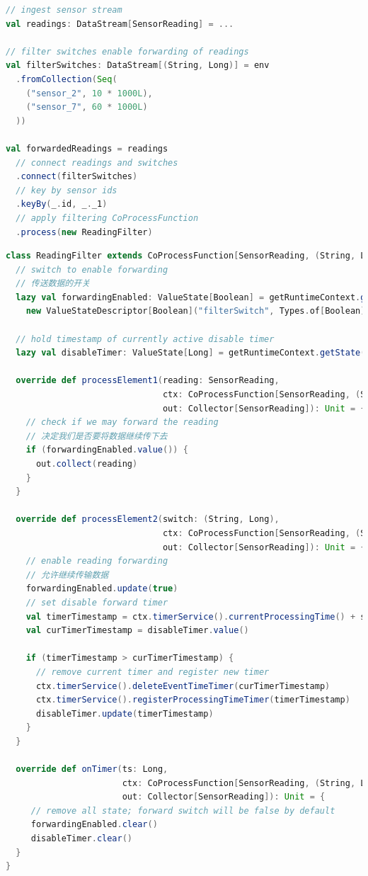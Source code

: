 \documentclass[oneside]{ctexbook}
\begin{document}
\begin{lstlisting}[language=scala]
// ingest sensor stream
val readings: DataStream[SensorReading] = ...

// filter switches enable forwarding of readings
val filterSwitches: DataStream[(String, Long)] = env
  .fromCollection(Seq(
    ("sensor_2", 10 * 1000L),
    ("sensor_7", 60 * 1000L)
  ))

val forwardedReadings = readings
  // connect readings and switches
  .connect(filterSwitches)
  // key by sensor ids
  .keyBy(_.id, _._1)
  // apply filtering CoProcessFunction
  .process(new ReadingFilter)
\end{lstlisting}

\begin{lstlisting}[language=scala]
class ReadingFilter extends CoProcessFunction[SensorReading, (String, Long), SensorReading] {
  // switch to enable forwarding
  // 传送数据的开关
  lazy val forwardingEnabled: ValueState[Boolean] = getRuntimeContext.getState(
    new ValueStateDescriptor[Boolean]("filterSwitch", Types.of[Boolean]))

  // hold timestamp of currently active disable timer
  lazy val disableTimer: ValueState[Long] = getRuntimeContext.getState(new ValueStateDescriptor[Long]("timer", Types.of[Long]))

  override def processElement1(reading: SensorReading,
                               ctx: CoProcessFunction[SensorReading, (String, Long), SensorReading]#Context,
                               out: Collector[SensorReading]): Unit = {
    // check if we may forward the reading
    // 决定我们是否要将数据继续传下去
    if (forwardingEnabled.value()) {
      out.collect(reading)
    }
  }

  override def processElement2(switch: (String, Long),
                               ctx: CoProcessFunction[SensorReading, (String, Long), SensorReading]#Context,
                               out: Collector[SensorReading]): Unit = {
    // enable reading forwarding
    // 允许继续传输数据
    forwardingEnabled.update(true)
    // set disable forward timer
    val timerTimestamp = ctx.timerService().currentProcessingTime() + switch._2
    val curTimerTimestamp = disableTimer.value()

    if (timerTimestamp > curTimerTimestamp) {
      // remove current timer and register new timer
      ctx.timerService().deleteEventTimeTimer(curTimerTimestamp)
      ctx.timerService().registerProcessingTimeTimer(timerTimestamp)
      disableTimer.update(timerTimestamp)
    }
  }

  override def onTimer(ts: Long,
                       ctx: CoProcessFunction[SensorReading, (String, Long), SensorReading]#OnTimerContext,
                       out: Collector[SensorReading]): Unit = {
     // remove all state; forward switch will be false by default
     forwardingEnabled.clear()
     disableTimer.clear()
  }
}
\end{lstlisting}
\end{document}
